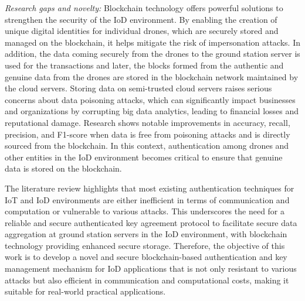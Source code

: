 \noindent\textit{Research gaps and novelty:} Blockchain technology offers powerful solutions to strengthen the security of the IoD environment. By enabling the creation of unique digital identities for individual drones, which are securely stored and managed on the blockchain, it helps mitigate the risk of impersonation attacks. In addition, the data coming securely from the drones to the ground station server is used for the transactions and later, the blocks formed from the authentic and genuine data from the drones are stored in the blockchain network maintained by the cloud servers. Storing data on semi-trusted cloud servers raises serious concerns about data poisoning attacks, which can significantly impact businesses and organizations by corrupting big data analytics, leading to financial losses and reputational damage. Research shows notable improvements in accuracy, recall, precision, and F1-score when data is free from poisoning attacks and is directly sourced from the blockchain. In this context, authentication among drones and other entities in the IoD environment becomes critical to ensure that genuine data is stored on the blockchain.

The literature review highlights that most existing authentication techniques for IoT and IoD environments are either inefficient in terms of communication and computation or vulnerable to various attacks. This underscores the need for a reliable and secure authenticated key agreement protocol to facilitate secure data aggregation at ground station servers in the IoD environment, with blockchain technology providing enhanced secure storage. Therefore, the objective of this work is to develop a novel and secure blockchain-based authentication and key management mechanism for IoD applications that is not only resistant to various attacks but also efficient in communication and computational costs, making it suitable for real-world practical applications.